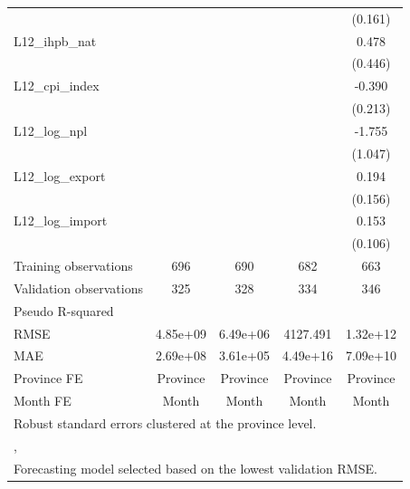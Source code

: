 {\begin{tabular}{l*{4}{c}}
                &                  &                  &                  &  (0.161)         \\
\addlinespace
L12\_ihpb\_nat    &                  &                  &                  &    0.478         \\
                &                  &                  &                  &  (0.446)         \\
\addlinespace
L12\_cpi\_index   &                  &                  &                  &   -0.390\sym{*}  \\
                &                  &                  &                  &  (0.213)         \\
\addlinespace
L12\_log\_npl     &                  &                  &                  &   -1.755\sym{*}  \\
                &                  &                  &                  &  (1.047)         \\
\addlinespace
L12\_log\_export  &                  &                  &                  &    0.194         \\
                &                  &                  &                  &  (0.156)         \\
\addlinespace
L12\_log\_import  &                  &                  &                  &    0.153         \\
                &                  &                  &                  &  (0.106)         \\
\midrule
Training observations&      696         &      690         &      682         &      663         \\
Validation observations&      325         &      328         &      334         &      346         \\
Pseudo R-squared&                  &                  &                  &                  \\
RMSE            & 4.85e+09         & 6.49e+06         & 4127.491         & 1.32e+12         \\
MAE             & 2.69e+08         & 3.61e+05         & 4.49e+16         & 7.09e+10         \\
Province FE     & Province         & Province         & Province         & Province         \\
Month FE        &    Month         &    Month         &    Month         &    Month         \\
\bottomrule
\multicolumn{5}{l}{\footnotesize Robust standard errors clustered at the province level.}\\
\multicolumn{5}{l}{\footnotesize ,}\\
\multicolumn{5}{l}{\footnotesize Forecasting model selected based on the lowest validation RMSE.}\\
\end{tabular}
}
